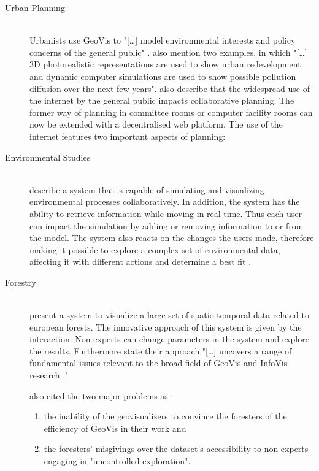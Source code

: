 \begin{description}

\item[Urban Planning] \hfill \\
Urbanists use \ac{GeoVis} to "[\ldots] model environmental interests and policy concerns of the general public" . \citeauthor{Jiang2003} also mention two examples, in which "[\ldots] 3D photorealistic representations are used to show urban redevelopment and dynamic computer simulations are used to show possible pollution diffusion over the next few years".
\citeauthor{Jiang2003} also describe that the widespread use of the internet by the general public impacts collaborative planning. The former way of planning in committee rooms or computer facility rooms can now be extended with a decentralised web platform. The use of the internet features two important aspects of planning:

\item[Environmental Studies] \hfill \\
\citeauthor{Danado2005} describe a system that is capable of simulating and visualizing environmental processes collaboratively. In addition, the system has the ability to retrieve information while moving in real time. Thus each user can impact the simulation by adding or removing information to or from the model. The system also reacts on the changes the users made, therefore making it possible to explore a complex set of environmental data, affecting it with different actions and determine a best fit .

\item[Forestry] \hfill \\
\citeauthor{Andrienko2007} present a system to visualize a large set of spatio-temporal data related to european forests. The innovative approach of this system is given by the interaction. Non-experts can change parameters in the system and explore the results. Furthermore \citeauthor{Andrienko2007} state their approach "[\ldots] uncovers a range of fundamental issues relevant to the broad field of \ac{GeoVis} and \ac{InfoVis} research ."

\citeauthor{Andrienko2007} also cited the two major problems as
\begin{enumerate}
\item the inability of the geovisualizers to convince the foresters of the efficiency of \ac{GeoVis} in their work and
\item the foresters' misgivings over the dataset's accessibility to non-experts engaging in "uncontrolled exploration".
\end{enumerate}


\end{description}
